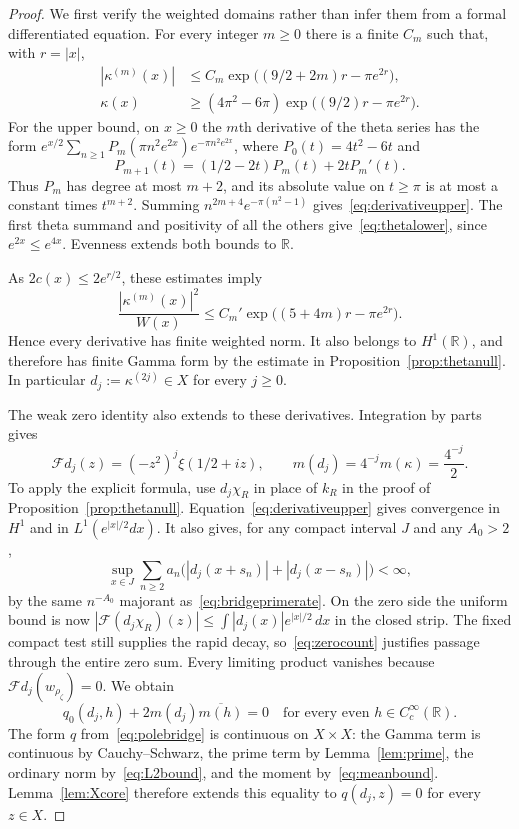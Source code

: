 \documentclass[11pt,a4paper]{article}
\numberwithin{equation}{section}
\theoremstyle{remark}
\newcommand{\R}{\mathbb R}
\begin{document}
\begin{proof}
We first verify the weighted domains rather than infer them from a formal differentiated equation. For every integer $m\ge0$ there is a finite $C_m$ such that, with $r=|x|$,
\begin{align}
 |\kappa^{(m)}(x)|
   &\le C_m\exp\!\bigl((9/2+2m)r-\pi e^{2r}\bigr),\label{eq:derivativeupper}\\
 \kappa(x)&\ge(4\pi^2-6\pi)
           \exp\!\bigl((9/2)r-\pi e^{2r}\bigr).\label{eq:thetalower}
\end{align}
For the upper bound, on $x\ge0$ the $m$th derivative of the theta series has the form
$e^{x/2}\sum_{n\ge1}P_m(\pi n^2e^{2x})e^{-\pi n^2e^{2x}}$,
where $P_0(t)=4t^2-6t$ and
\[
 P_{m+1}(t)=(1/2-2t)P_m(t)+2tP_m'(t).
\]
Thus $P_m$ has degree at most $m+2$, and its absolute value on $t\ge\pi$ is at most a constant times $t^{m+2}$. Summing
$n^{2m+4}e^{-\pi(n^2-1)}$ gives~\eqref{eq:derivativeupper}. The first theta summand and positivity of all the others give~\eqref{eq:thetalower}, since $e^{2x}\le e^{4x}$. Evenness extends both bounds to $\R$.

As $2c(x)\le2e^{r/2}$, these estimates imply
\begin{equation}\label{eq:derivativeweighted}
 \frac{|\kappa^{(m)}(x)|^2}{W(x)}
    \le C_m'\exp\!\bigl((5+4m)r-\pi e^{2r}\bigr).
\end{equation}
Hence every derivative has finite weighted norm. It also belongs to $H^1(\R)$, and therefore has finite Gamma form by the estimate in Proposition~\ref{prop:thetanull}. In particular $d_j:=\kappa^{(2j)}\in X$ for every $j\ge0$.

The weak zero identity also extends to these derivatives. Integration by parts gives
\[
 \mathcal Fd_j(z)=(-z^2)^j\xi(1/2+iz),\qquad
 m(d_j)=4^{-j}m(\kappa)=\frac{4^{-j}}2.
\]
To apply the explicit formula, use $d_j\chi_R$ in place of $k_R$ in the proof of Proposition~\ref{prop:thetanull}. Equation~\eqref{eq:derivativeupper} gives convergence in $H^1$ and in $L^1(e^{|x|/2}dx)$. It also gives, for any compact interval $J$ and any $A_0>2$,
\[
 \sup_{x\in J}\sum_{n\ge2}a_n
       \bigl(|d_j(x+s_n)|+|d_j(x-s_n)|\bigr)<\infty,
\]
by the same $n^{-A_0}$ majorant as~\eqref{eq:bridgeprimerate}. On the zero side the uniform bound is now
$|\mathcal F(d_j\chi_R)(z)|\le\int|d_j(x)|e^{|x|/2}\,dx$
in the closed strip. The fixed compact test still supplies the rapid decay, so~\eqref{eq:zerocount} justifies passage through the entire zero sum. Every limiting product vanishes because $\mathcal Fd_j(w_{\rho_\zeta})=0$. We obtain
\[
 q_0(d_j,h)+2m(d_j)\overline{m(h)}=0
 \quad\text{for every even }h\in C_c^\infty(\R).
\]
The form $q$ from~\eqref{eq:polebridge} is continuous on $X\times X$: the Gamma term is continuous by Cauchy--Schwarz, the prime term by Lemma~\ref{lem:prime}, the ordinary norm by~\eqref{eq:L2bound}, and the moment by~\eqref{eq:meanbound}. Lemma~\ref{lem:Xcore} therefore extends this equality to $q(d_j,z)=0$ for every $z\in X$.


\end{proof}
\end{document}
